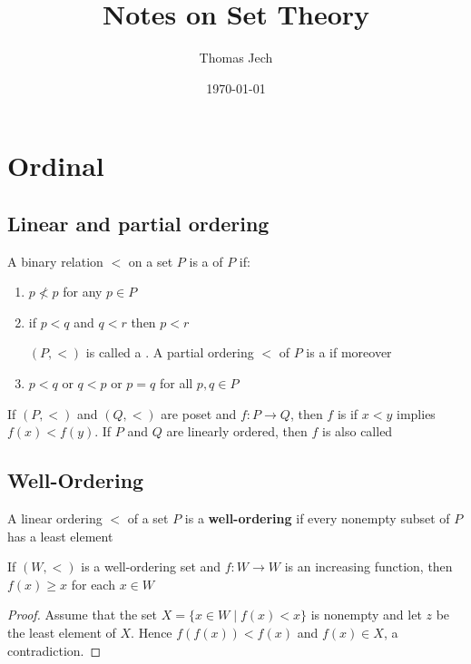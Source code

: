 \documentclass[11pt]{article}
\author{Thomas Jech}
\date{\today}
\title{Notes on Set Theory}
\begin{document}
\maketitle
\tableofcontents \clearpage
\section{Ordinal}
\label{sec:org857f4bb}
\subsection{Linear and partial ordering}
\label{sec:org51c5191}
\begin{definition}
A binary relation \(<\) on a set \(P\) is a  of \(P\) if:
\begin{enumerate}
\item \(p\not< p\) for any \(p\in P\)
\item if \(p<q\) and \(q<r\) then \(p<r\)

\((P,<)\) is called a . A partial ordering \(<\) of
\(P\) is a  if moreover
\item \(p<q\) or \(q<p\) or \(p=q\) for all \(p,q\in P\)
\end{enumerate}
\end{definition}


If \((P,<)\) and \((Q,<)\) are poset and \(f:P\to Q\), then \(f\) is
 if \(x<y\) implies \(f(x)<f(y)\). If \(P\) and \(Q\) are
linearly ordered, then \(f\) is also called 
\subsection{Well-Ordering}
\label{sec:orga7403d0}
\begin{definition}[]
A linear ordering \(<\) of a set \(P\) is a \textbf{well-ordering} if every nonempty
subset of \(P\) has a least element
\end{definition}

\begin{lemma}[]
\label{lemma1}
If \((W,<)\) is a well-ordering set and \(f:W\to W\) is an increasing function,
then \(f(x)\ge x\) for each \(x\in W\)
\end{lemma}
\begin{proof}
Assume that the set \(X=\{x\in W\mid f(x)<x\}\) is nonempty and let \(z\) be the
least element of \(X\). Hence \(f(f(x))<f(x)\) and \(f(x)\in X\), a contradiction.
\end{proof}
\end{document}

